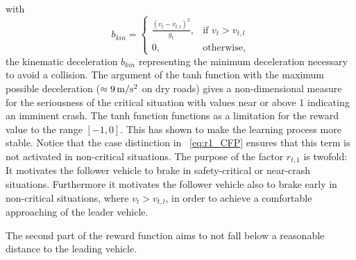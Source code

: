\documentclass[review]{elsarticle}
\providecommand{\martinc}[1]{}                  %
\providecommand{\sub}[1]{_{\mathrm{#1}}}  %
\providecommand{\3}{{\ss}}
\begin{document}
	with
	\begin{equation}
	\label{bkin}
	b_{kin} = 
	\begin{cases}
	\frac{(v_t-v_{t,l})^2}{g_t},& \text{if } v_t>v_{t,l}\\
	0,              & \text{otherwise},
	\end{cases}
	\end{equation}
	the kinematic deceleration $b_{kin}$ representing the minimum deceleration necessary to avoid a collision.
	The argument of the tanh function with  the
	maximum possible deceleration ($\approx \unit[9]{m/s^2}$ on dry roads) gives a
	non-dimensional measure for the seriousness of the critical situation
	with values 
	near or above 1 indicating an imminent crash.  The tanh function functions as a limitation for the reward value to the range $[-1,0]$. This has shown to make the learning process more stable. Notice that the case distinction in ~\eqref{eq:r1_CFP}  ensures that
	this term is not activated in non-critical situations. The purpose of
	the factor $r_{t,1}$ is twofold: It motivates the follower vehicle to
	brake in safety-critical or near-crash situations.  Furthermore it
	motivates the follower vehicle also to brake early in non-critical
	situations, where $ v_t>v_{t,l}$, in order to achieve a comfortable
	approaching of the leader vehicle.\martinc{Nicht wirklich, weil diese
		Funktion nur in zumindest milde kritischen Situationen $b\sub{kin}>b\sub{comf}$ anspringt.}
	
	The second part of the reward function aims to not fall below a reasonable
	distance to the leading vehicle.
	
\end{document}
